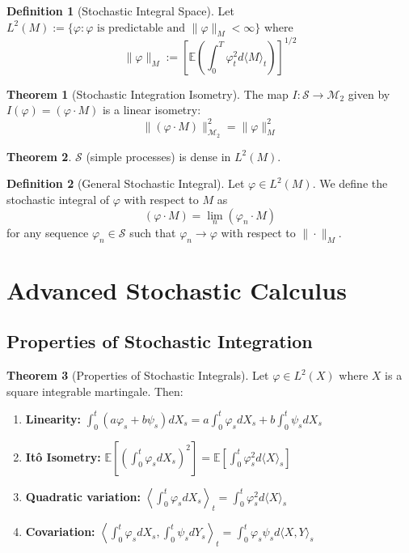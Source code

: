 \documentclass[11pt,a4paper]{article}
\theoremstyle{definition}
\newtheorem{definition}{Definition}[section]
\newtheorem{theorem}{Theorem}[section]
\begin{document}
\begin{definition}[Stochastic Integral Space]\label{def:l2_space}
Let $L^2(M) := \{\varphi : \varphi \text{ is predictable and } \|\varphi\|_M < \infty\}$
where
\[
\|\varphi\|_M := \left[\mathbb{E}\left(\int_0^T \varphi_t^2 d\langle M \rangle_t\right)\right]^{1/2}
\]
\end{definition}

\begin{theorem}[Stochastic Integration Isometry]\label{thm:stoch_int_isometry}
The map $I: \mathcal{S} \to \mathcal{M}_2$ given by $I(\varphi) = (\varphi \cdot M)$ is a linear isometry:
\[
\|(\varphi \cdot M)\|_{\mathcal{M}_2}^2 = \|\varphi\|_M^2
\]
\end{theorem}

\begin{theorem}\label{thm:density_simple}
$\mathcal{S}$ (simple processes) is dense in $L^2(M)$.
\end{theorem}

\begin{definition}[General Stochastic Integral]\label{def:general_stoch_int}
Let $\varphi \in L^2(M)$. We define the stochastic integral of $\varphi$ with respect to $M$ as
\[
(\varphi \cdot M) = \lim_n (\varphi_n \cdot M)
\]
for any sequence $\varphi_n \in \mathcal{S}$ such that $\varphi_n \to \varphi$ with respect to $\|\cdot\|_M$.
\end{definition}

\newpage

\section{Advanced Stochastic Calculus}

\subsection{Properties of Stochastic Integration}

\begin{theorem}[Properties of Stochastic Integrals]\label{thm:stoch_int_properties}
Let $\varphi \in L^2(X)$ where $X$ is a square integrable martingale. Then:
\begin{enumerate}
    \item \textbf{Linearity:} $\int_0^t (a\varphi_s + b\psi_s) dX_s = a\int_0^t \varphi_s dX_s + b\int_0^t \psi_s dX_s$
    
    \item \textbf{Itô Isometry:} $\mathbb{E}\left[\left(\int_0^t \varphi_s dX_s\right)^2\right] = \mathbb{E}\left[\int_0^t \varphi_s^2 d\langle X \rangle_s\right]$
    
    \item \textbf{Quadratic variation:} $\left\langle \int_0^t \varphi_s dX_s \right\rangle_t = \int_0^t \varphi_s^2 d\langle X \rangle_s$
    
    \item \textbf{Covariation:} $\left\langle \int_0^t \varphi_s dX_s, \int_0^t \psi_s dY_s \right\rangle_t = \int_0^t \varphi_s \psi_s d\langle X, Y \rangle_s$
\end{enumerate}
\end{theorem}
\end{document}

